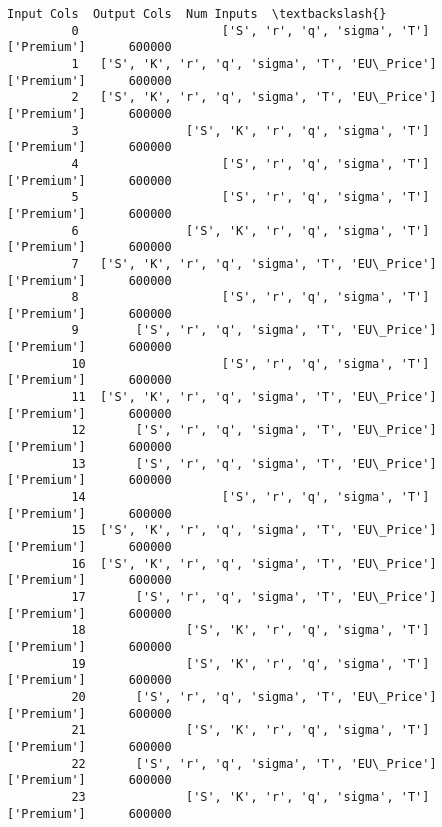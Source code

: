 \documentclass[11pt]{article}
\begin{document}
\begin{Verbatim}[commandchars=\\\{\}]
                                                 Input Cols  Output Cols  Num Inputs  \textbackslash{}
         0                    ['S', 'r', 'q', 'sigma', 'T']  ['Premium']      600000   
         1   ['S', 'K', 'r', 'q', 'sigma', 'T', 'EU\_Price']  ['Premium']      600000   
         2   ['S', 'K', 'r', 'q', 'sigma', 'T', 'EU\_Price']  ['Premium']      600000   
         3               ['S', 'K', 'r', 'q', 'sigma', 'T']  ['Premium']      600000   
         4                    ['S', 'r', 'q', 'sigma', 'T']  ['Premium']      600000   
         5                    ['S', 'r', 'q', 'sigma', 'T']  ['Premium']      600000   
         6               ['S', 'K', 'r', 'q', 'sigma', 'T']  ['Premium']      600000   
         7   ['S', 'K', 'r', 'q', 'sigma', 'T', 'EU\_Price']  ['Premium']      600000   
         8                    ['S', 'r', 'q', 'sigma', 'T']  ['Premium']      600000   
         9        ['S', 'r', 'q', 'sigma', 'T', 'EU\_Price']  ['Premium']      600000   
         10                   ['S', 'r', 'q', 'sigma', 'T']  ['Premium']      600000   
         11  ['S', 'K', 'r', 'q', 'sigma', 'T', 'EU\_Price']  ['Premium']      600000   
         12       ['S', 'r', 'q', 'sigma', 'T', 'EU\_Price']  ['Premium']      600000   
         13       ['S', 'r', 'q', 'sigma', 'T', 'EU\_Price']  ['Premium']      600000   
         14                   ['S', 'r', 'q', 'sigma', 'T']  ['Premium']      600000   
         15  ['S', 'K', 'r', 'q', 'sigma', 'T', 'EU\_Price']  ['Premium']      600000   
         16  ['S', 'K', 'r', 'q', 'sigma', 'T', 'EU\_Price']  ['Premium']      600000   
         17       ['S', 'r', 'q', 'sigma', 'T', 'EU\_Price']  ['Premium']      600000   
         18              ['S', 'K', 'r', 'q', 'sigma', 'T']  ['Premium']      600000   
         19              ['S', 'K', 'r', 'q', 'sigma', 'T']  ['Premium']      600000   
         20       ['S', 'r', 'q', 'sigma', 'T', 'EU\_Price']  ['Premium']      600000   
         21              ['S', 'K', 'r', 'q', 'sigma', 'T']  ['Premium']      600000   
         22       ['S', 'r', 'q', 'sigma', 'T', 'EU\_Price']  ['Premium']      600000   
         23              ['S', 'K', 'r', 'q', 'sigma', 'T']  ['Premium']      600000   
         

\end{Verbatim}
\end{document}
